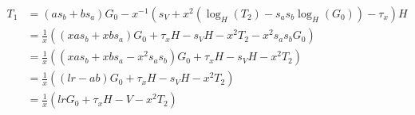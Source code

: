 \begin{pproof}
\begin{pproof}
{\begin{align*}
        T_1 &= (as_b + bs_a)G_0 - x^{-1}(s_V  + x^2(\log_H(T_2) - s_as_b\log_H(G_0)) - \tau_x)H\\
            &= \frac{1}{x}((xas_b + xbs_a)G_0 + \tau_xH - s_VH - x^2T_2 - x^2s_as_bG_0)\\
            &= \frac{1}{x}((xas_b + xbs_a - x^2s_as_b)G_0 + \tau_xH - s_VH - x^2T_2)\\
            &= \frac{1}{x}((lr - ab)G_0 + \tau_xH - s_VH - x^2T_2)\\
            &= \frac{1}{x}(lr G_0 + \tau_xH - V - x^2T_2)\\
      \end{align*}}
  \end{pproof}
\end{pproof}